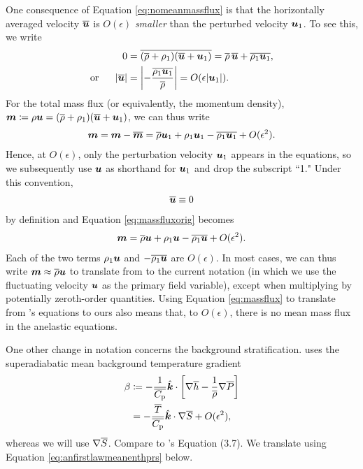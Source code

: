 \documentclass[12pt]{article}
\newcommand{\veck}{\hat{\bm{k}}}
\newcommand{\uover}{\overline{\vecu}}
\begin{document}
	One consequence of Equation \eqref{eq:nomeanmassflux} is that the horizontally averaged velocity $\overline{\bm{u}}$ is $O(\epsilon)$ \textit{smaller} than the perturbed velocity ${\bm{u}}_1$. To see this, we write
	\begin{align}\label{eq:smallumean}
		0 &= \overline{(\rhoover+\rhoone)(\overline{\vecu}+{\vecu}_1)} = \rhoover\,\uover + \overline{\rhoone{\vecu}_1},\nonumber\\
		\orr |\uover| &= \left|-\frac{\overline{\rhoone{\vecu}_1}}{\rhoover}\right| = O(\epsilon|{\vecu}_1|).
	\end{align}
	For the total mass flux (or equivalently, the momentum density), $\bm{m}\coloneqq \rho\bm{u}=(\overline{\rho}+\rho_1)(\overline{\bm{u}}+{\bm{u}}_1)$, we can thus write
		\begin{align}\label{eq:massfluxorig}
		\bm{m} = \bm{m}-\overline{\bm{m}}=\overline{\rho}{\bm{u}}_1 + \rho_1{\bm{u}}_1 - \overline{\rho_1{\bm{u}}_1} + O(\epsilon^2).
	\end{align}
	Hence, at $O(\epsilon)$, only the perturbation velocity ${\bm{u}}_1$ appears in the equations, so we subsequently use $\bm{u}$ as shorthand for ${\bm{u}}_1$ and drop the subscript ``1." Under this convention,
\begin{align}\label{eq:nomeanu}
	\overline{\bm{u}}\equiv0
\end{align}
	by definition and Equation \eqref{eq:massfluxorig} becomes
	\begin{align}\label{eq:massflux}
		\bm{m} = \overline{\rho}\bm{u} + \rho_1\bm{u} - \overline{\rho_1\bm{u}} + O(\epsilon^2).
	\end{align}
	Each of the two terms $\rho_1\bm{u}$ and $-\overline{\rho_1\bm{u}}$ are $O(\epsilon)$. In most cases, we can thus write $\bm{m} \approx \overline{\rho} \bm{u}$ to translate from \citet{Gough1969} to the current notation (in which we use the fluctuating velocity $\bm{u}$ as the primary field variable), except when multiplying by potentially zeroth-order quantities. Using Equation \eqref{eq:massflux} to translate from \citet{Gough1969}'s equations to ours also means that, to $O(\epsilon)$, there is no mean mass flux in the anelastic equations. 
	
	 One other change in notation concerns the background stratification. \citet{Gough1969} uses the superadiabatic mean background temperature gradient
	\begin{align}\label{eq:superad}
		\beta &\define -\frac{1}{\cpover}\veck\cdot\left[\nabla\overline{h}-\frac{1}{\rhoover}\nabla\prsover\right]\nonumber\\
		&=-\frac{\tmpover}{\cpover}\veck\dotgrad\entrover + O(\epsilon^2),
	\end{align}
	whereas we will use $\nabla \overline{S}$. Compare to \citet{Gough1969}'s Equation (3.7). We translate using Equation \eqref{eq:anfirstlawmeanenthprs} below. 
	
\end{document}
